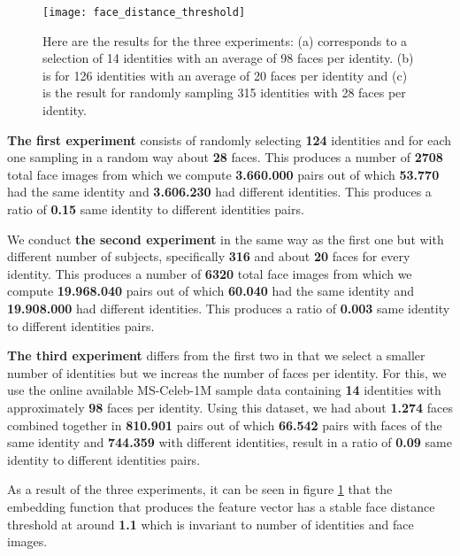 \begin{figure}[H]
	\captionsetup{width=15cm,font=small}
	\begin{center}
		\texttt{[image: face\_distance\_threshold]}
	\end{center}
	\caption[Faces distances histograms]{Here are the results for the three experiments: (a) corresponds to a selection of 14 identities with an average of 98 faces per identity. (b) is for 126 identities with an average of 20 faces per identity and (c) is the result for randomly sampling 315 identities with 28 faces per identity.}
	\label{fig:face_distance_threshold}
\end{figure}

\textbf{The first experiment} consists of randomly selecting \textbf{124} identities and for each one sampling in a random way about \textbf{28} faces. This produces a number of \textbf{2708} total face images from which we compute \textbf{3.660.000} pairs out of which \textbf{53.770} had the same identity and \textbf{3.606.230} had different identities. This produces a ratio of \textbf{0.15} same identity to different identities pairs.

We conduct \textbf{the second experiment} in the same way as the first one but with different number of subjects, specifically \textbf{316} and about \textbf{20} faces for every identity. This produces a number of \textbf{6320} total face images from which we compute \textbf{19.968.040} pairs out of which \textbf{60.040} had the same identity and \textbf{19.908.000} had different identities. This produces a ratio of \textbf{0.003} same identity to different identities pairs.

\textbf{The third experiment} differs from the first two in that we select a smaller number of identities but we increas the number of faces per identity. For this, we use the online available MS-Celeb-1M sample data containing \textbf{14} identities with approximately \textbf{98} faces per identity. Using this dataset, we had about \textbf{1.274} faces combined together in \textbf{810.901} pairs out of which \textbf{66.542} pairs with faces of the same identity and \textbf{744.359} with different identities, result in a ratio of \textbf{0.09} 	same identity to different identities pairs.


As a result of the three experiments, it can be seen in figure \ref{fig:face_distance_threshold} that the embedding function that produces the feature vector has a stable face distance threshold at around \textbf{1.1} which is invariant to number of identities and face images.
